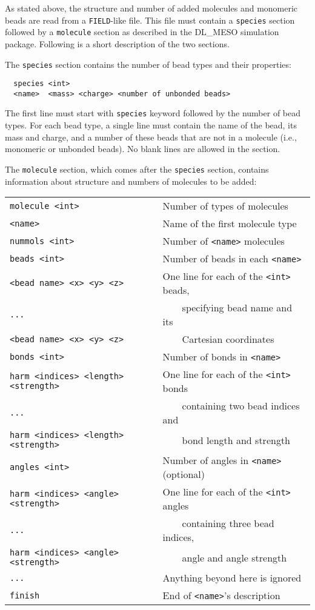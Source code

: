 As stated above, the structure and number of added molecules and monomeric
beads are read from a \texttt{FIELD}-like file. This file must contain a
\texttt{species} section followed by a \texttt{molecule} section as
described in the DL\_MESO simulation package. Following is a short
description of the two sections.

The \texttt{species} section contains the number of bead types and their
properties:
\begin{verbatim}
  species <int>
  <name>  <mass> <charge> <number of unbonded beads>
\end{verbatim}
The first line must start with \texttt{species} keyword followed by the
number of bead types. For each bead type, a single line must contain the
name of the bead, its mass and charge, and a number of these beads that are
not in a molecule (i.e., monomeric or unbonded beads). No blank lines are
allowed in the section.

The \texttt{molecule} section, which comes after the \texttt{species}
section, contains information about structure and numbers of molecules to
be added:

\noindent
\begin{longtable}{ll}
  \texttt{molecule <int>} & Number of types of molecules \\
  \texttt{<name>} & Name of the first molecule type \\
  \texttt{nummols <int>} & Number of \texttt{<name>} molecules \\
  \texttt{beads <int>} & Number of beads in each \texttt{<name>} \\
  \texttt{<bead name> <x> <y> <z>} & One line for each of the \texttt{<int>} beads, \\
  \texttt{...} & \ \ \ \ specifying bead name and its \\
  \texttt{<bead name> <x> <y> <z>} & \ \ \ \ Cartesian coordinates \\
  \texttt{bonds <int>} & Number of bonds in \texttt{<name>} \\
  \texttt{harm <indices> <length> <strength>} & One line for each of the \texttt{<int>} bonds \\
  \texttt{...} & \ \ \ \ containing two bead indices and \\
  \texttt{harm <indices> <length> <strength>} & \ \ \ \ bond length and strength \\
  \texttt{angles <int>} & Number of angles in \texttt{<name>} (optional) \\
  \texttt{harm <indices> <angle> <strength>} & One line for each of the \texttt{<int>} angles \\
  \texttt{...} & \ \ \ \ containing three bead indices, \\
  \texttt{harm <indices> <angle> <strength>} & \ \ \ \ angle and angle strength \\
  \texttt{...} & Anything beyond here is ignored \\
  \texttt{finish} & End of \texttt{<name>}'s description \\
\end{longtable}


